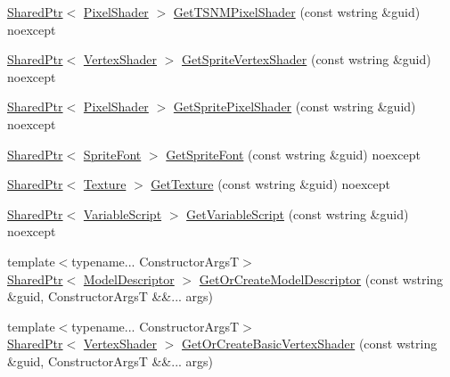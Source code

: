 \begin{DoxyCompactItemize}
\hyperlink{namespacemage_a1e01ae66713838a7a67d30e44c67703e}{Shared\+Ptr}$<$ \hyperlink{classmage_1_1_pixel_shader}{Pixel\+Shader} $>$ \hyperlink{classmage_1_1_resource_manager_a8f90226c6e3f0d5ef0c159ccfc0b46aa}{Get\+T\+S\+N\+M\+Pixel\+Shader} (const wstring \&guid) noexcept
\item 
\hyperlink{namespacemage_a1e01ae66713838a7a67d30e44c67703e}{Shared\+Ptr}$<$ \hyperlink{classmage_1_1_vertex_shader}{Vertex\+Shader} $>$ \hyperlink{classmage_1_1_resource_manager_a1ac90a5ce2cee1a06731bc8c57b86deb}{Get\+Sprite\+Vertex\+Shader} (const wstring \&guid) noexcept
\item 
\hyperlink{namespacemage_a1e01ae66713838a7a67d30e44c67703e}{Shared\+Ptr}$<$ \hyperlink{classmage_1_1_pixel_shader}{Pixel\+Shader} $>$ \hyperlink{classmage_1_1_resource_manager_a792f554641a11f5782ffccb5b3f0364c}{Get\+Sprite\+Pixel\+Shader} (const wstring \&guid) noexcept
\item 
\hyperlink{namespacemage_a1e01ae66713838a7a67d30e44c67703e}{Shared\+Ptr}$<$ \hyperlink{classmage_1_1_sprite_font}{Sprite\+Font} $>$ \hyperlink{classmage_1_1_resource_manager_a6ad7dc799e076da85d4638380b1838ff}{Get\+Sprite\+Font} (const wstring \&guid) noexcept
\item 
\hyperlink{namespacemage_a1e01ae66713838a7a67d30e44c67703e}{Shared\+Ptr}$<$ \hyperlink{classmage_1_1_texture}{Texture} $>$ \hyperlink{classmage_1_1_resource_manager_a2aaa87096cb50a43fdacb5cdb7d729a8}{Get\+Texture} (const wstring \&guid) noexcept
\item 
\hyperlink{namespacemage_a1e01ae66713838a7a67d30e44c67703e}{Shared\+Ptr}$<$ \hyperlink{classmage_1_1_variable_script}{Variable\+Script} $>$ \hyperlink{classmage_1_1_resource_manager_ac54eb6fd61322a66bdc704a88eca192d}{Get\+Variable\+Script} (const wstring \&guid) noexcept
\item 
{\footnotesize template$<$typename... Constructor\+ArgsT$>$ }\\\hyperlink{namespacemage_a1e01ae66713838a7a67d30e44c67703e}{Shared\+Ptr}$<$ \hyperlink{classmage_1_1_model_descriptor}{Model\+Descriptor} $>$ \hyperlink{classmage_1_1_resource_manager_a14d0569212724c7b79acb753d6cebccb}{Get\+Or\+Create\+Model\+Descriptor} (const wstring \&guid, Constructor\+ArgsT \&\&... args)
\item 
{\footnotesize template$<$typename... Constructor\+ArgsT$>$ }\\\hyperlink{namespacemage_a1e01ae66713838a7a67d30e44c67703e}{Shared\+Ptr}$<$ \hyperlink{classmage_1_1_vertex_shader}{Vertex\+Shader} $>$ \hyperlink{classmage_1_1_resource_manager_a91672677243b12c06aedfb81e5fb8553}{Get\+Or\+Create\+Basic\+Vertex\+Shader} (const wstring \&guid, Constructor\+ArgsT \&\&... args)

\end{DoxyCompactItemize}
